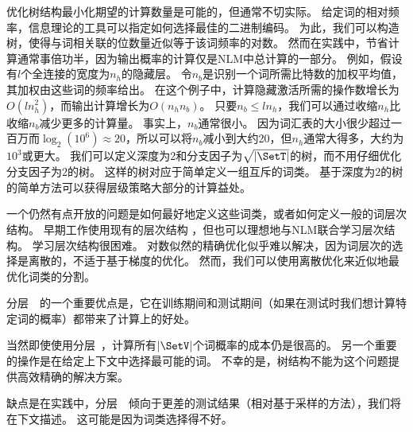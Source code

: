 优化树结构最小化期望的计算数量是可能的，但通常不切实际。
给定词的相对频率，信息理论的工具可以指定如何选择最佳的二进制编码。
为此，我们可以构造树，使得与词相关联的位数量近似等于该词频率的对数。
然而在实践中，节省计算通常事倍功半，因为输出概率的计算仅是\gls{NLM}中总计算的一部分。
例如，假设有$l$个全连接的宽度为$n_h$的隐藏层。
令$n_b$是识别一个词所需比特数的加权平均值，其加权由这些词的频率给出。
在这个例子中，计算隐藏激活所需的操作数增长为$O(ln_h^2)$，而输出计算增长为$O(n_h n_b)$。
只要$ n_b \leq l n_h$，我们可以通过收缩$n_h$比收缩$n_b$减少更多的计算量。
事实上，$n_b$通常很小。
因为词汇表的大小很少超过一百万而$\log_ 2(10^6) \approx 20$，所以可以将$n_b$减小到大约20，但$n_h$通常大得多，大约为$10^3$或更大。
我们可以定义深度为2和分支因子为$\sqrt{|\SetT|}$的树，而不用仔细优化分支因子为$2$的树。
这样的树对应于简单定义一组互斥的词类。
基于深度为$2$的树的简单方法可以获得层级策略大部分的计算益处。


一个仍然有点开放的问题是如何最好地定义这些词类，或者如何定义一般的词层次结构。
早期工作使用现有的层次结构\citep{Morin+Bengio-2005-small} ，但也可以理想地与\gls{NLM}联合学习层次结构。
学习层次结构很困难。
对数似然的精确优化似乎难以解决，因为词层次的选择是离散的，不适于基于梯度的优化。
然而，我们可以使用离散优化来近似地最优化词类的分割。

分层~~的一个重要优点是，它在训练期间和测试期间（如果在测试时我们想计算特定词的概率）都带来了计算上的好处。

当然即使使用分层~，计算所有$|\SetV|$个词概率的成本仍是很高的。
另一个重要的操作是在给定上下文中选择最可能的词。
不幸的是，树结构不能为这个问题提供高效精确的解决方案。

缺点是在实践中，分层~~倾向于更差的测试结果（相对基于采样的方法），我们将在下文描述。
这可能是因为词类选择得不好。


